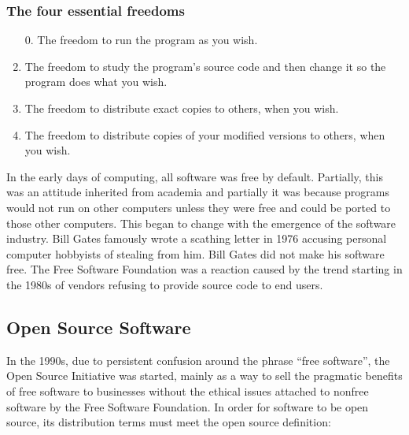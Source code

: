 \documentclass[12pt,letterpaper]{article}
\begin{document}
\subsubsection*{The four essential freedoms}
\begin{enumerate}
\item[0.] The freedom to run the program as you wish.
\item The freedom to study the program's source code and then change it so the program does what you wish.
\item The freedom to distribute exact copies to others, when you wish.
\item The freedom to distribute copies of your modified versions to others, when you wish.
\end{enumerate}

 In the early days of computing, all software was free by default. Partially, this was an attitude inherited from academia and partially it was because programs would not run on other computers unless they were free and could be ported to those other computers. This began to change with the emergence of the software industry. Bill Gates famously wrote a scathing letter in  1976 accusing personal computer hobbyists of stealing from him. Bill Gates did not make his software free. The Free Software Foundation was a reaction caused by the trend starting in the 1980s of vendors refusing to provide source code to end users.

\subsection{Open Source Software}

In the 1990s, due to persistent confusion around the phrase ``free software'', the Open Source Initiative was started, mainly as a way to sell the pragmatic benefits of free software to businesses without the ethical issues attached to nonfree software by the Free Software Foundation. In order for software to be open source, its distribution terms must meet the open source definition:
\end{document}
